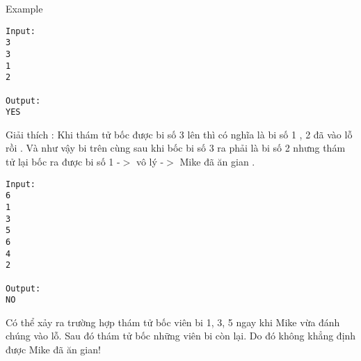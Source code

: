 Example
\begin{verbatim}
Input:
3
3
1
2

Output:
YES
\end{verbatim}

   Giải thích : Khi thám tử bốc được bi số 3 lên thì có nghĩa là bi số 1 , 2 đã vào lỗ rồi . Và như vậy bi trên cùng sau khi bốc bi số 3 ra phải là bi số 2 nhưng thám tử lại bốc ra được bi số 1 -$>$ vô lý -$>$ Mike đã ăn gian .  
\begin{verbatim}
Input:
6
1
3
5
6
4
2

Output:
NO
\end{verbatim}

   Có thể xảy ra trường hợp thám tử bốc viên bi 1, 3, 5 ngay khi Mike vừa đánh chúng vào lỗ. Sau đó thám tử bốc những viên bi còn lại. Do đó không khẳng định được Mike đã ăn gian!